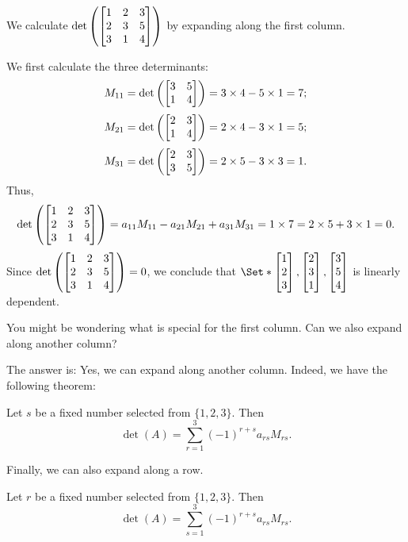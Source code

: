 \begin{example}
	We calculate $\det\left(\mat{1 & 2 & 3 \\ 2 & 3 & 5 \\ 3 & 1 & 4}\right)$ by
	expanding along the first column.

	We first calculate the three determinants:
	\[
		M_{11}=\det\left(\mat{3 & 5 \\ 1 & 4}\right)=3\times 4 - 5\times 1=7;
	\]
	\[
		M_{21}=\det\left(\mat{2 & 3 \\ 1 & 4}\right)=2\times 4 - 3\times 1=5;
	\]
	\[
		M_{31}=\det\left(\mat{2 & 3 \\ 3 & 5}\right)=2\times 5 - 3\times 3=1.
	\]
	Thus,
	\[
		\det\left(\mat{1 & 2 & 3 \\ 2 & 3 & 5 \\ 3 & 1 & 4}\right)=a_{11}M_{11}-a_{21}M_{21}+a_{31}M_{31}=1\times 7=2\times 5+3\times 1=0.
	\]
	Since $\det\left(\mat{1 & 2 & 3 \\ 2 & 3 & 5 \\ 3 & 1 & 4}\right)=0$, we
	conclude that $\Set*{\mat{1 \\ 2 \\ 3},\mat{2 \\ 3 \\ 1},\mat{3\\ 5 \\4}}$
	is linearly dependent.
\end{example}

You might be wondering what is special for the first column. Can we also expand along
another column?

The answer is: Yes, we can expand along another column. Indeed, we have the following
theorem:
\begin{theorem}
	Let $s$ be a fixed number selected from $\{1,2,3\}$. Then
	\[
		\det(A)=\sum_{r=1}^{3}(-1)^{r+s}a_{rs}M_{rs}.
	\]
\end{theorem}

Finally, we can also expand along a row.
\begin{theorem}
	Let $r$ be a fixed number selected from $\{1,2,3\}$. Then
	\[
		\det(A)=\sum_{s=1}^{3}(-1)^{r+s}a_{rs}M_{rs}.
	\]
\end{theorem}

